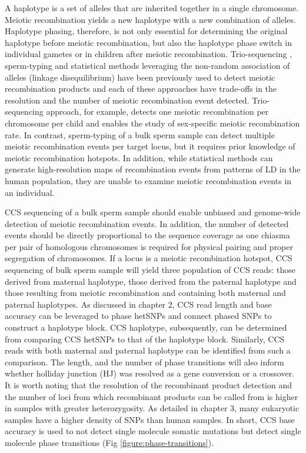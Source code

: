 A haplotype is a set of alleles that are inherited together in a single chromosome. Meiotic recombination yields a new haplotype with a new combination of alleles. Haplotype phasing, therefore, is not only essential for determining the original haplotype before meiotic recombination, but also the haplotype phase switch in individual gametes or in children after meiotic recombination. Trio-sequencing \cite{Kong2010-uk}, sperm-typing \cite{Webb2008-pw} and statistical methods leveraging the non-random association of alleles (linkage disequilibrium) \cite{Myers2005-ml} have been previously used to detect meiotic recombination products and each of these approaches have trade-offs in the resolution and the number of meiotic recombination event detected. Trio-sequencing approach, for example, detects one meiotic recombination per chromosome per child and enables the study of sex-specific meiotic recombination rate. In contrast, sperm-typing of a bulk sperm sample can detect multiple meiotic recombination events per target locus, but it requires prior knowledge of meiotic recombination hotspots. In addition, while statistical methods can generate high-resolution maps of recombination events from patterns of LD in the human population, they are unable to examine meiotic recombination events in an individual.

CCS sequencing of a bulk sperm sample should enable unbiased and genome-wide detection of meiotic recombination events. In addition, the number of detected events should be directly proportional to the sequence coverage as one chiasma per pair of homologous chromosomes is required for physical pairing and proper segregation of chromosomes. If a locus is a meiotic recombination hotspot, CCS sequencing of bulk sperm sample will yield three population of CCS reads: those derived from maternal haplotype, those derived from the paternal haplotype and those resulting from meiotic recombination and containing both maternal and paternal haplotypes. As discussed in chapter 2, CCS read length and base accuracy can be leveraged to phase hetSNPs and connect phased SNPs to construct a haplotype block. CCS haplotype, subsequently, can be determined from comparing CCS hetSNPs to that of the haplotype block. Similarly, CCS reads with both maternal and paternal haplotype can be identified from such a comparison. The length, and the number of phase transitions will also inform whether holliday junction (HJ) was resolved as a gene conversion or a crossover. It is worth noting that the resolution of the recombinant product detection and the number of loci from which recombinant products can be called from is higher in samples with greater heterozygosity. As detailed in chapter 3, many eukaryotic samples have a higher density of SNPs than human samples. In short, CCS base accuracy is used to not detect single molecule somatic mutations but detect single molecule phase transitions (Fig \ref{figure:phase-transitions}).

